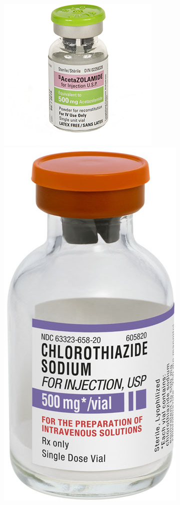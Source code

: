\documentclass{beamer}
\begin{document}
\begin{frame}
\begin{columns}
			\end{columns}
			\begin{columns}
				\centering
				\includegraphics[height=.4\textheight,keepaspectratio]{media/acetazolamide.png}
				\centering
				\includegraphics[height=.4\textheight,keepaspectratio]{media/chlorothiazide.jpg}
			\end{columns}
\end{frame}
\end{document}
